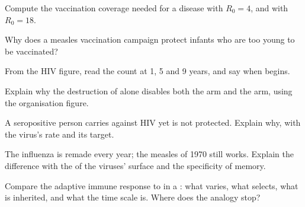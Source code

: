 \begin{exercise}[$\star\star$]\label{exo:g12:adaptive-immunity:9}
Compute the vaccination coverage needed for a disease with $R_0 = 4$,
and with $R_0 = 18$.
\end{exercise}

\begin{exercise}[$\star\star$]\label{exo:g12:adaptive-immunity:10}
Why does a measles vaccination campaign protect infants who are too
young to be vaccinated?
\end{exercise}

\begin{exercise}[$\star\star$]\label{exo:g12:adaptive-immunity:11}
From the HIV figure, read the  count at 1, 5 and 9 years,
and say when  begins.
\end{exercise}

\begin{exercise}[$\star\star\star$]\label{exo:g12:adaptive-immunity:12}
Explain why the destruction of  alone disables both the
 arm and the  arm, using the organisation figure.
\end{exercise}

\begin{exercise}[$\star\star\star$]\label{exo:g12:adaptive-immunity:13}
A seropositive person carries  against HIV yet is not
protected. Explain why, with the virus's  rate and its target.
\end{exercise}

\begin{exercise}[$\star\star\star$]\label{exo:g12:adaptive-immunity:14}
The influenza  is remade every year; the measles  of
1970 still works. Explain the difference with the  of the
viruses' surface  and the specificity of memory.
\end{exercise}

\begin{exercise}[$\star\star\star$]\label{exo:g12:adaptive-immunity:15}
Compare the adaptive immune response to  in a
: what varies, what selects, what is inherited, and what
the time scale is. Where does the analogy stop?
\end{exercise}


